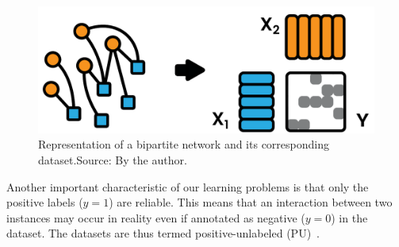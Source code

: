 \begin{figure}[tb]
    \centering
    \includegraphics[width=.7\textwidth]{figures/bipartite_dataset.pdf}
    \caption{Representation of a bipartite network and its corresponding dataset.\newline Source: By the author.}
    \label{fig:bipartite dataset}
\end{figure}

Another important characteristic of our learning problems is that only the positive labels ($y=1$) are reliable. This means that an interaction between two instances may occur in reality even if annotated as negative ($y=0$) in the dataset. The datasets are thus termed positive-unlabeled (PU)~\cite{bekker2020learning}.







%

